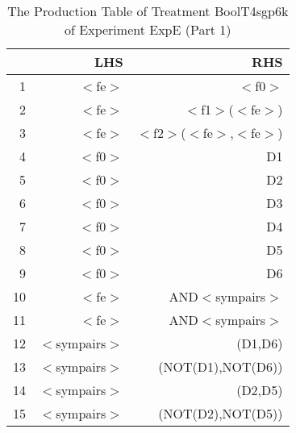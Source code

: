 \begin{table}[ht]
\centering
\begin{tabular}{rrr}
  \hline
 & LHS & RHS \\ 
  \hline
1 & $<$fe$>$ & $<$f0$>$ \\ 
  2 & $<$fe$>$ & $<$f1$>$($<$fe$>$) \\ 
  3 & $<$fe$>$ & $<$f2$>$($<$fe$>$,$<$fe$>$) \\ 
  4 & $<$f0$>$ & D1 \\ 
  5 & $<$f0$>$ & D2 \\ 
  6 & $<$f0$>$ & D3 \\ 
  7 & $<$f0$>$ & D4 \\ 
  8 & $<$f0$>$ & D5 \\ 
  9 & $<$f0$>$ & D6 \\ 
  10 & $<$fe$>$ & AND$<$sympairs$>$ \\ 
  11 & $<$fe$>$ & AND$<$sympairs$>$ \\ 
  12 & $<$sympairs$>$ & (D1,D6) \\ 
  13 & $<$sympairs$>$ & (NOT(D1),NOT(D6)) \\ 
  14 & $<$sympairs$>$ & (D2,D5) \\ 
  15 & $<$sympairs$>$ & (NOT(D2),NOT(D5)) \\ 
   \hline
\end{tabular}
\caption{The Production Table of Treatment BoolT4sgp6k of Experiment ExpE (Part 1)} 
\end{table}
